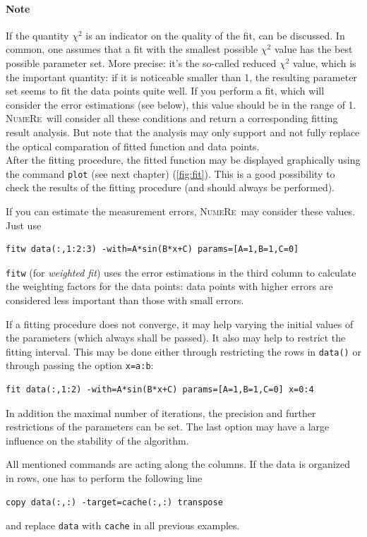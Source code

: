 \documentclass[DIV=14,headsepline,footsepline]{scrbook}
\newcommand{\NR}{\textsc{Nu\-me\-Re}}
\begin{document}
				
				\paragraph{Note}
					If the quantity $\chi^2$ is an indicator on the quality of the fit, can be discussed. In common, one assumes that a fit with the smallest possible $\chi^2$ value has the best possible parameter set. More precise: it's the so-called reduced $\chi^2$ value, which is the important quantity: if it is noticeable smaller than 1, the resulting parameter set seems to fit the data points quite well. If you perform a fit, which will consider the error estimations (see below), this value should be in the range of 1. \NR\ will consider all these conditions and return a corresponding fitting result analysis. But note that the analysis may only support and not fully replace the optical comparation of fitted function and data points.\bigskip\\
				After the fitting procedure, the fitted function may be displayed graphically using the command \lstinline+plot+ (see next chapter) (\autoref{fig:fit}). This is a good possibility to check the results of the fitting procedure (and should always be performed).
				
				If you can estimate the measurement errors, \NR\ may consider these values. Just use
				\begin{lstlisting}
fitw data(:,1:2:3) -with=A*sin(B*x+C) params=[A=1,B=1,C=0]
				\end{lstlisting}
				\lstinline+fitw+ (for \emph{weighted fit}) uses the error estimations in the third column to calculate the weighting factors for the data points: data points with higher errors are considered less important than those with small errors.
				
				If a fitting procedure does not converge, it may help varying the initial values of the parameters (which always shall be passed). It also may help to restrict the fitting interval. This may be done either through restricting the rows in \lstinline+data()+ or through passing the option \lstinline+x=a:b+:
				\begin{lstlisting}
fit data(:,1:2) -with=A*sin(B*x+C) params=[A=1,B=1,C=0] x=0:4
				\end{lstlisting}
				In addition the maximal number of iterations, the precision and further restrictions of the parameters can be set. The last option may have a large influence on the stability of the algorithm.
				
				All mentioned commands are acting along the columns. If the data is organized in rows, one has to perform the following line
				\begin{lstlisting}
copy data(:,:) -target=cache(:,:) transpose
				\end{lstlisting}
				and replace \lstinline+data+ with \lstinline+cache+ in all previous examples.
\end{document}
